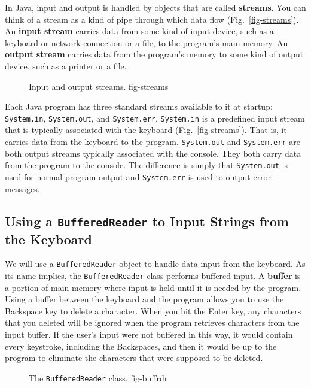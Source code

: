 In Java, input and output is handled by objects that are called
{\bf streams}.  You can think of a stream as a kind of pipe through
which data flow (Fig.~\ref{fig-streams}).  An {\bf input stream}
carries data from some kind of input device, such as a keyboard or
network connection or a file, to the program's main memory. An {\bf
output stream} carries data from the program's memory to some kind of
output device, such as a printer or a file.

\begin{figure}[h]
{Input and output streams.
} {fig-streams}

\end{figure}

Each Java program has three standard streams available to it at
startup: {\tt System.in}, {\tt System.out}, and {\tt System.err}.
{\tt System.in} is a predefined input stream that is typically
associated with the keyboard (Fig.~\ref{fig-streams}). That is, it
carries data from the keyboard to the program. {\tt System.out} and
{\tt System.err} are both output streams typically associated with the
console.  They both carry data from the program to the console.  The
difference is simply that {\tt System.out} is used for normal program
output and {\tt System.err} is used to output error messages.

\subsection{Using a {\tt BufferedReader} to Input Strings from the Keyboard}

We will use a {\tt BufferedReader} object to handle data input from
the keyboard. As its name implies, the {\tt BufferedReader} class
performs buffered input. A {\bf buffer} is a portion of main memory
where input is held until it is needed by the program. Using a
 buffer between the keyboard and the
program allows you to use the Backspace key to delete a
character. When you hit the Enter key, any characters that you deleted
will be ignored when the program retrieves characters from the input
buffer. If the user's input were not buffered in this way, it would
contain every keystroke, including the Backspaces, and then it would
be up to the program to eliminate the characters that were
supposed to be deleted.

\begin{figure}[h]
{The {\tt Buf\-fer\-ed\-Read\-er} class.
} {fig-buffrdr}

\end{figure}

